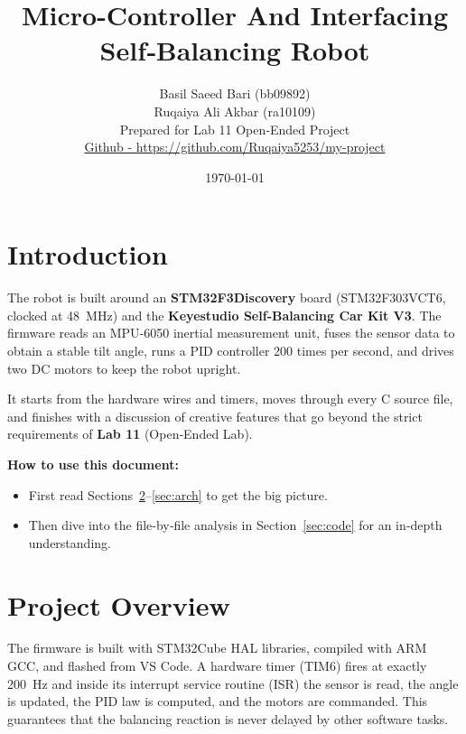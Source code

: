 \documentclass[12pt,a4paper]{article}
\begin{document}
	
	\title{\Huge \textbf{Micro-Controller And Interfacing Self‑Balancing Robot}\\[0.3em]}
	\author{ Basil Saeed Bari (bb09892) \\ Ruqaiya Ali Akbar (ra10109) \\ Prepared for Lab 11 Open‑Ended Project\\
	\href{https://github.com/Ruqaiya5253/my-project}{Github - https://github.com/Ruqaiya5253/my-project} }
	\date{\today}
	
	\maketitle
	
	\tableofcontents
	\newpage
	
	\section{Introduction}
	\label{sec:intro}
	The robot is built around an \textbf{STM32F3Discovery} board (STM32F303VCT6, clocked at \SI{48}{\mega\hertz}) and the \textbf{Keyestudio Self‑Balancing Car Kit V3}.  
	The firmware reads an MPU‑6050 inertial measurement unit, fuses the sensor data to obtain a stable tilt angle, runs a PID controller 200 times per second, and drives two DC motors to keep the robot upright.
	
	It starts from the hardware wires and timers, moves through every C source file, and finishes with a discussion of creative features that go beyond the strict requirements of \textbf{Lab 11} (Open‑Ended Lab).  
	
	\bigskip
	\noindent\textbf{How to use this document:}
	\begin{itemize}
		\item First read Sections~\ref{sec:overview}--\ref{sec:arch} to get the big picture.
		\item Then dive into the file‑by‑file analysis in Section~\ref{sec:code} for an in‑depth understanding.
	\end{itemize}
	
	\section{Project Overview}
	\label{sec:overview}
	The firmware is built with STM32Cube HAL libraries, compiled with ARM GCC, and flashed from VS Code.  
	A hardware timer (TIM6) fires at exactly \SI{200}{\hertz} and inside its interrupt service routine (ISR) the sensor is read, the angle is updated, the PID law is computed, and the motors are commanded.  
	This guarantees that the balancing reaction is never delayed by other software tasks.
	
\end{document}
